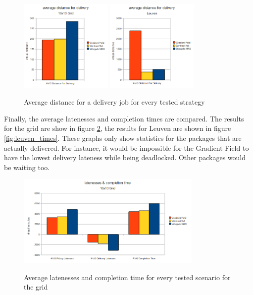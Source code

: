 \begin{figure}[H]
	\begin{center}
		\includegraphics[width=0.4\textwidth]{./figs/grid_distance.png}
		\quad
		\includegraphics[width=0.4\textwidth]{./figs/leuven_distance.png}
		\label{fig:distances}
		\caption{Average distance for a delivery job for every tested strategy}
	\end{center}
\end{figure}

\npar Finally, the average latenesses and completion times are compared. The
results for the grid are show in figure \ref{fig:grid_times}, the results for
Leuven are shown in figure \ref{fig:leuven_times}. These graphs only show
statistics for the packages that are actually delivered. For instance, it would
be impossible for the Gradient Field to have the lowest delivery lateness while
being deadlocked. Other packages would be waiting too.

\begin{figure}[H]
	\begin{center}
		\includegraphics[width=0.8\textwidth]{./figs/grid_times.png}
		\label{fig:grid_times}
		\caption{Average latenesses and completion time for every tested scenario for
		the grid}
	\end{center}
\end{figure}

